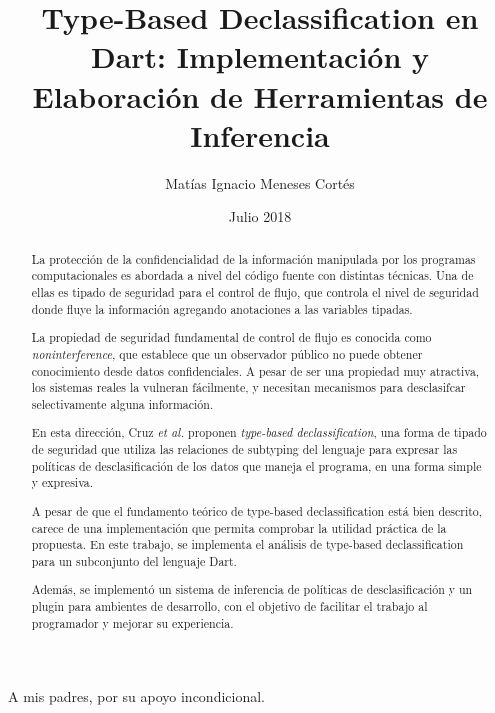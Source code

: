 \documentclass[upright, contnum]{umemoria}
\author{Matías Ignacio Meneses Cortés}
\title{Type-Based Declassification en Dart: Implementación y Elaboración de Herramientas de Inferencia}
\date{Julio 2018}
\begin{document}
\setcounter{chapter}{1}
\frontmatter
\maketitle

\begin{abstract}
	La protección de la confidencialidad de la información manipulada por los programas computacionales es abordada a nivel del código fuente con distintas técnicas. Una de ellas es tipado de seguridad para el control de flujo, que controla el nivel de seguridad donde fluye la información agregando anotaciones a las variables tipadas.

	La propiedad de seguridad fundamental de control de flujo es conocida como \emph{noninterference}, que establece que un observador público no puede obtener conocimiento desde datos confidenciales. A pesar de ser una propiedad muy atractiva, los sistemas reales la vulneran fácilmente, y necesitan mecanismos para desclasifcar selectivamente alguna información.

	En esta dirección, Cruz \textit{et al.} proponen \emph{type-based declassification}, una forma de tipado de seguridad que utiliza las relaciones de subtyping del lenguaje para expresar las políticas de desclasificación de los datos que maneja el programa, en una forma simple y expresiva.

	A pesar de que el fundamento teórico de type-based declassification está bien descrito, carece de una implementación que permita comprobar la utilidad práctica de la propuesta. En este trabajo, se implementa el análisis de type-based declassification para un subconjunto del lenguaje Dart.

	Además, se implementó un sistema de inferencia de políticas de desclasificación y un plugin para ambientes de desarrollo, con el objetivo de facilitar el trabajo al programador y mejorar su experiencia.
\end{abstract}

\begin{dedicatoria} %
A mis padres, por su apoyo incondicional.
\end{dedicatoria}

\cleardoublepage

\tableofcontents

\mainmatter














\end{document}
